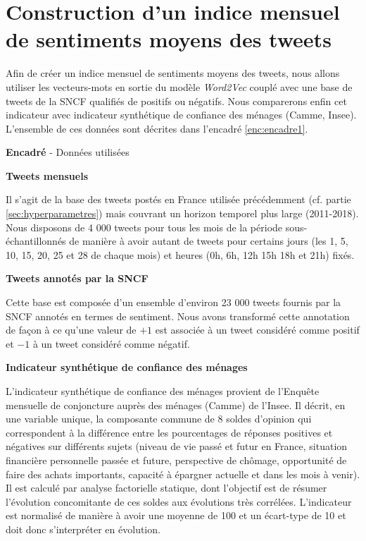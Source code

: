 \documentclass[11pt,french,french]{article}
\newcounter{comptEncadre}
\renewcommand\thecomptEncadre{%
\arabic{comptEncadre}}
\newenvironment{encadre}[2][false]{\refstepcounter{comptEncadre}
\begin{bclogo}[couleur=processblue!5,arrondi=0.1,
logo=\bcloupe,barre=none,couleurBord=blue!60!green,nobreak = #1]{ {\sc \textbf{Encadré \thecomptEncadre}} -  #2}
\smallskip
}{\end{bclogo}}
\begin{document}
\hypertarget{sec:sentimentalAnalysis}{%
\section{Construction d'un indice mensuel de sentiments moyens des tweets}\label{sec:sentimentalAnalysis}}

Afin de créer un indice mensuel de sentiments moyens des tweets, nous allons utiliser les vecteurs-mots en sortie du modèle \emph{Word2Vec} couplé avec une base de tweets de la SNCF qualifiés de positifs ou négatifs.
Nous comparerons enfin cet indicateur avec indicateur synthétique de confiance des ménages (Camme, Insee). L'ensemble de ces données sont décrites dans l'encadré \ref{enc:encadre1}.

\begin{encadre}[true]{Données utilisées}\label{enc:encadre1}

\small

\textbf{Tweets mensuels}

Il s'agit de la base des tweets postés en France utilisée précédemment (cf. partie  \ref{sec:hyperparametres}) mais couvrant un horizon temporel plus large (2011-2018).
Nous disposons de 4 000 tweets pour tous les mois de la période sous-échantillonnés de manière à avoir autant de tweets pour certains jours (les 1, 5, 10, 15, 20, 25 et 28 de chaque mois) et heures (0h, 6h, 12h 15h 18h et 21h) fixés. 

\textbf{Tweets annotés par la SNCF}

Cette base est composée d'un ensemble d'environ 23 000 tweets fournis par la SNCF annotés en termes de sentiment.
Nous avons transformé cette annotation de façon à ce qu'une valeur de $+1$ est associée à un tweet considéré comme positif et $-1$ à un tweet considéré comme négatif.


\textbf{Indicateur synthétique de confiance des ménages}

L’indicateur synthétique de confiance des ménages provient de l'Enquête mensuelle de conjoncture auprès des ménages (Camme) de l’Insee.
Il décrit, en une variable unique, la composante commune de 8 soldes d’opinion qui correspondent à la différence entre les pourcentages de réponses positives et négatives sur différents sujets (niveau de vie passé et futur en France, situation financière personnelle passée et future, perspective de chômage, opportunité de faire des achats importants, capacité à épargner actuelle et dans les mois à venir).
Il est calculé par analyse factorielle statique, dont l’objectif est de résumer l’évolution concomitante de ces soldes aux évolutions très corrélées.
L’indicateur est normalisé de manière à avoir une moyenne de 100 et un écart-type de 10 et doit donc s’interpréter en évolution. 

\end{encadre}
\end{document}
